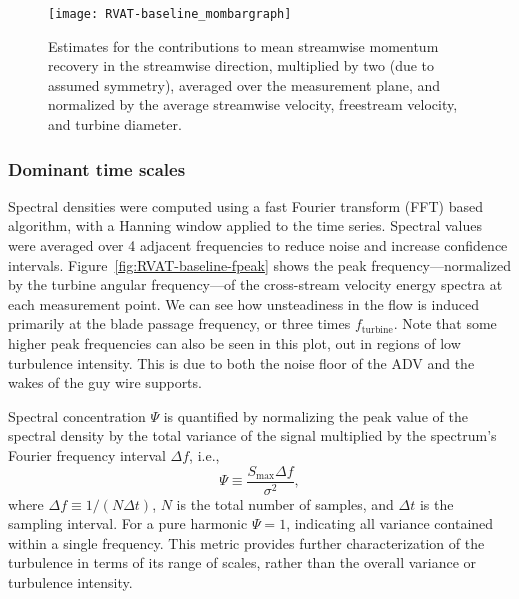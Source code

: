 \begin{figure}
    \centering
    
    \texttt{[image: RVAT-baseline\_mombargraph]}
    
    \caption{Estimates for the contributions to mean streamwise momentum
        recovery in the streamwise direction, multiplied by two (due to assumed
        symmetry), averaged over the measurement plane, and normalized by the
        average streamwise velocity, freestream velocity, and turbine diameter.}
    
    \label{fig:mombargraph}
\end{figure}


\subsubsection{Dominant time scales}

Spectral densities were computed using a fast Fourier transform (FFT) based
algorithm, with a Hanning window applied to the time series. Spectral values
were averaged over 4 adjacent frequencies to reduce noise and increase
confidence intervals. Figure~\ref{fig:RVAT-baseline-fpeak} shows the peak
frequency---normalized by the turbine angular frequency---of the cross-stream
velocity energy spectra at each measurement point. We can see how unsteadiness
in the flow is induced primarily at the blade passage frequency, or three times
$f_\mathrm{turbine}$. Note that some higher peak frequencies can also be seen in
this plot, out in regions of low turbulence intensity. This is due to both the
noise floor of the ADV and the wakes of the guy wire supports.

Spectral concentration $\Psi$ is quantified by normalizing the peak value of the
spectral density by the total variance of the signal multiplied by the
spectrum's Fourier frequency interval $\Delta f$, i.e.,
\begin{equation}
    \Psi \equiv \frac{S_{\max} \Delta f}{\sigma^2},
    \label{eq:spectral-concentration}
\end{equation}
where $\Delta f \equiv 1/(N \Delta t)$, $N$ is the total number of samples, and
$\Delta t$ is the sampling interval. For a pure harmonic $\Psi = 1$, indicating
all variance contained within a single frequency. This metric provides further
characterization of the turbulence in terms of its range of scales, rather than
the overall variance or turbulence intensity.

